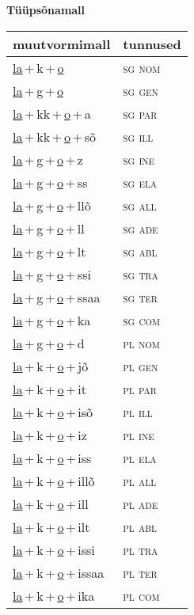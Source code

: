 
\vspace{1.8em}
\begin{minipage}{\textwidth}
\textbf{Tüüpsõnamall \,}\\

\begin{sideways}
\begin{tabular}{l l}
muutvormimall & tunnused \\
\hline
\underline{la}\,+\,k\,+\,\underline{o} & \textsc{ sg nom } \\
\underline{la}\,+\,g\,+\,\underline{o} & \textsc{ sg gen } \\
\underline{la}\,+\,kk\,+\,\underline{o}\,+\,a & \textsc{ sg par } \\
\underline{la}\,+\,kk\,+\,\underline{o}\,+\,sõ & \textsc{ sg ill } \\
\underline{la}\,+\,g\,+\,\underline{o}\,+\,z & \textsc{ sg ine } \\
\underline{la}\,+\,g\,+\,\underline{o}\,+\,ss & \textsc{ sg ela } \\
\underline{la}\,+\,g\,+\,\underline{o}\,+\,llõ & \textsc{ sg all } \\
\underline{la}\,+\,g\,+\,\underline{o}\,+\,ll & \textsc{ sg ade } \\
\underline{la}\,+\,g\,+\,\underline{o}\,+\,lt & \textsc{ sg abl } \\
\underline{la}\,+\,g\,+\,\underline{o}\,+\,ssi & \textsc{ sg tra } \\
\underline{la}\,+\,g\,+\,\underline{o}\,+\,ssaa & \textsc{ sg ter } \\
\underline{la}\,+\,g\,+\,\underline{o}\,+\,ka & \textsc{ sg com } \\
\underline{la}\,+\,g\,+\,\underline{o}\,+\,d & \textsc{ pl nom } \\
\underline{la}\,+\,k\,+\,\underline{o}\,+\,jõ & \textsc{ pl gen } \\
\underline{la}\,+\,k\,+\,\underline{o}\,+\,it & \textsc{ pl par } \\
\underline{la}\,+\,k\,+\,\underline{o}\,+\,isõ & \textsc{ pl ill } \\
\underline{la}\,+\,k\,+\,\underline{o}\,+\,iz & \textsc{ pl ine } \\
\underline{la}\,+\,k\,+\,\underline{o}\,+\,iss & \textsc{ pl ela } \\
\underline{la}\,+\,k\,+\,\underline{o}\,+\,illõ & \textsc{ pl all } \\
\underline{la}\,+\,k\,+\,\underline{o}\,+\,ill & \textsc{ pl ade } \\
\underline{la}\,+\,k\,+\,\underline{o}\,+\,ilt & \textsc{ pl abl } \\
\underline{la}\,+\,k\,+\,\underline{o}\,+\,issi & \textsc{ pl tra } \\
\underline{la}\,+\,k\,+\,\underline{o}\,+\,issaa & \textsc{ pl ter } \\
\underline{la}\,+\,k\,+\,\underline{o}\,+\,ika & \textsc{ pl com } \\
\end{tabular}
\end{sideways}
\label{tab:tüüpsõnamall-lako}


\end{minipage}
